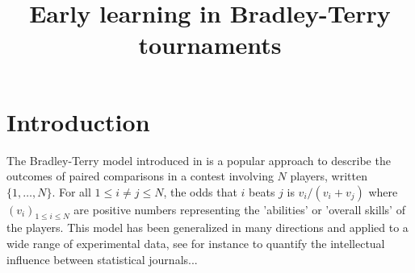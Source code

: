 


\title{Early learning in Bradley-Terry tournaments}
\date{}

\author{}

\lhead{}

\maketitle

\begin{abstract}

\end{abstract}

\section{Introduction}
The Bradley-Terry model introduced in \cite{bradley:terry:1952,zemerlo:1929} is a popular approach to describe the outcomes of paired comparisons in a contest involving $N$ players, written $\{1,\ldots,N\}$. For all $1\le i \ne j\le N$, the odds that $i$ beats $j$ is $v_i/(v_i+v_j)$ where $(v_i)_{1\le i\le N}$ are positive numbers representing the 'abilities' or 'overall skills' of  the players. This model has been generalized in many directions and applied to a wide range of experimental data, see for instance \cite{stigler:1994} to quantify the intellectual influence between statistical journals...
\cite{hastie:tibshirani:1998}
\cite{hunter:2004}

